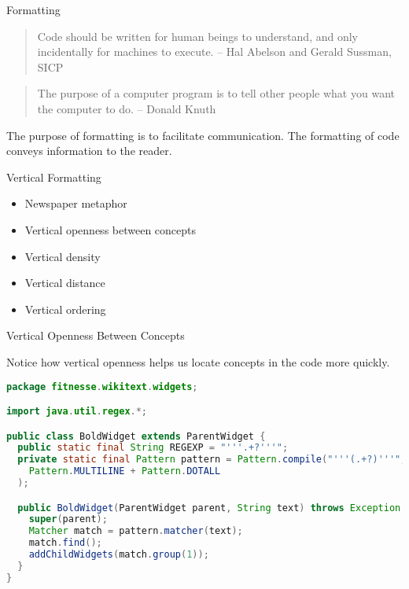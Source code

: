 \documentclass{beamer}
\author[Chris Simpkins] 
{Christopher Simpkins \\\texttt{chris.simpkins@gatech.edu}}
\institute[Georgia Tech] %
\date[CS 1331]{}
\begin{document}
\begin{frame}
  \titlepage
\end{frame}

\begin{frame}[fragile]{Formatting}

\begin{quote}
Code should be written for human beings to understand, and only incidentally for machines to execute. -- Hal Abelson and Gerald Sussman, SICP
\end{quote}

\begin{quote}
The purpose of a computer program is to tell other people what you want the computer to do. -- Donald Knuth
\end{quote}


The purpose of formatting is to facilitate communication.  The formatting of code conveys information to the reader.



\end{frame}

\begin{frame}[fragile]{Vertical Formatting}

\begin{itemize}
\item Newspaper metaphor
\item Vertical openness between concepts
\item Vertical density
\item Vertical distance
\item Vertical ordering
\end{itemize}


\end{frame}

\begin{frame}[fragile]{Vertical Openness Between Concepts}


Notice how vertical openness helps us locate concepts in the code more quickly.
\begin{lstlisting}[language=Java]
package fitnesse.wikitext.widgets;

import java.util.regex.*;

public class BoldWidget extends ParentWidget {
  public static final String REGEXP = "'''.+?'''";
  private static final Pattern pattern = Pattern.compile("'''(.+?)'''",
    Pattern.MULTILINE + Pattern.DOTALL
  );

  public BoldWidget(ParentWidget parent, String text) throws Exception { 
    super(parent);
    Matcher match = pattern.matcher(text);
    match.find();
    addChildWidgets(match.group(1));
  }
}
\end{lstlisting}

\end{frame}
\end{document}
